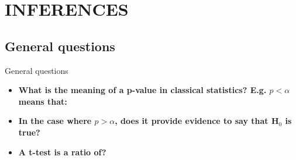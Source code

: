 \documentclass{beamer}
\begin{document}
%





\section{INFERENCES}

\subsection[General questions]{General questions}

\begin{frame}{General questions}
  \begin{itemize}
    \item \textbf{What is the meaning of a p-value in classical statistics? E.g. $p < \alpha$ means that:}


    \bigskip
    \item \textbf{In the case where $p > \alpha$, does it provide evidence to say that H$_{0}$ is true?}


    \bigskip
    \item \textbf{A t-test is a ratio of?}

%
  \end{itemize}
\end{frame}
\end{document}
